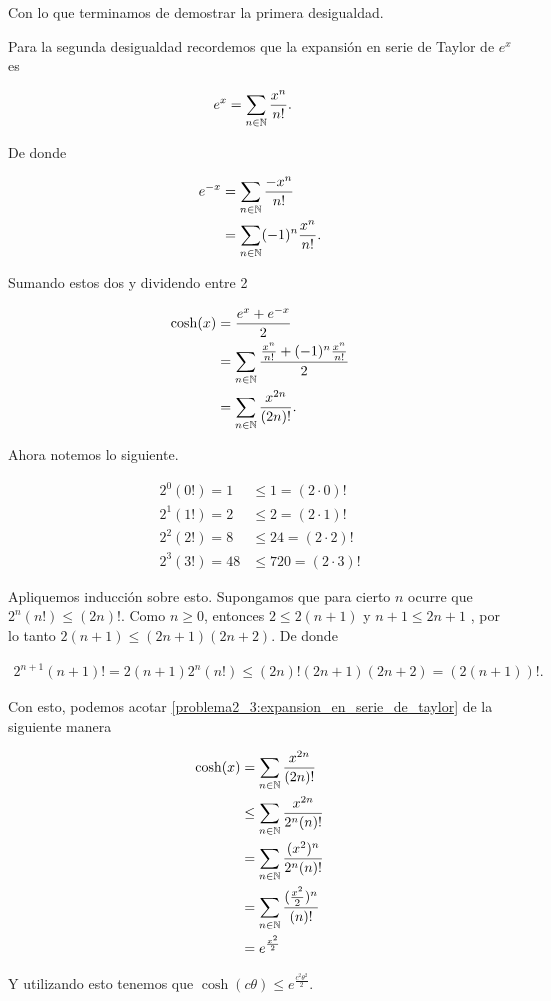 Con lo que terminamos de demostrar la primera desigualdad.\pn

Para la segunda desigualdad recordemos que la expansión en serie de Taylor de $e^x$ es

\begin{align}
    e^x     &=  \sum_{n \in \mathbb{N}} \frac{x^{n}}{n!}.   \label{Expansion_de_taylor_de_e}
\end{align}\pn

De donde 

\begin{align}
    e^{-x}  &=  \sum_{n \in \mathbb{N}} \frac{-x^{n}}{n!}           \\
            &=  \sum_{n \in \mathbb{N}} (-1)^{n}\frac{x^{n}}{n!}.   
\end{align}\pn

Sumando estos dos y dividendo entre 2

\begin{align}
    \cosh(x)    &=  \frac{e^x + e^{-x}}{2}                                                  \\
                &=  \sum_{n \in \mathbb{N}} \frac{\frac{x^{n}}{n!} + (-1)^{n}\frac{x^{n}}{n!}}{2}   \\
                &=  \sum_{n \in \mathbb{N}} \frac{x^{2n}}{(2n)!}. \label{problema2_3:expansion_en_serie_de_taylor}
\end{align}\pn

Ahora notemos lo siguiente.

\begin{align}
    2^0(0!) = 1     &\leq  1     = (2 \cdot 0)!      \\
    2^1(1!) = 2     &\leq  2     = (2 \cdot 1)!      \\
    2^2(2!) = 8     &\leq  24    = (2 \cdot 2)!      \\
    2^3(3!) = 48    &\leq 720    = (2 \cdot 3)!      
\end{align}\pn

Apliquemos inducción sobre esto. Supongamos que para cierto $n$ ocurre que $2^n(n!) \leq (2n)!$. Como $n \geq 0$, 
entonces $2 \leq 2(n + 1)$ y $n + 1\leq 2n+1$ , por lo tanto $2 (n+1) \leq (2n+1) (2n + 2)$. 
De donde 

\begin{align}
    2^{n+1}(n+1)! = 2(n+1) 2^n(n!) \leq (2n)! (2n+1)(2n+2) = (2(n+1))!.
\end{align}\pn

Con esto, podemos acotar \eqref{problema2_3:expansion_en_serie_de_taylor} de la siguiente manera

\begin{align}
    \cosh(x)    &=      \sum_{n \in \mathbb{N}} \frac{x^{2n}}{(2n)!}            \\
                &\leq   \sum_{n \in \mathbb{N}} \frac{x^{2n}}{2^n(n)!}          \\
                &=   \sum_{n \in \mathbb{N}} \frac{(x^2)^{n}}{2^n(n)!}          \\
                &=   \sum_{n \in \mathbb{N}} \frac{(\frac{x^2}{2})^{n}}{(n)!}   \\   
                &=   e^{\frac{x^2}{2}}   
\end{align}

Y utilizando esto tenemos que $\cosh(c \theta) \leq e^{\frac{c^2 \theta^2}{2}}$.


